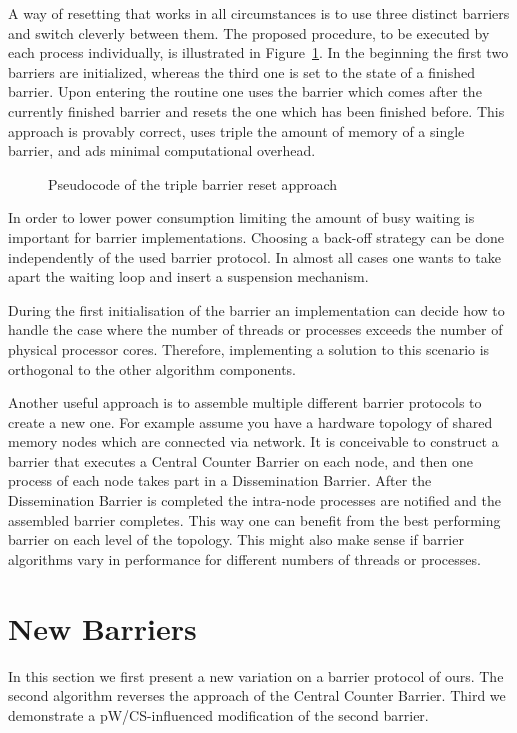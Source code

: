 \documentclass[a4paper, 10pt]{article}
\newcommand*\cleartooddpage{
	\clearpage
	\ifthenelse{\isodd{\thepage}}
		{}
		{\newpage \mbox{} \clearpage}
}
\begin{document}
A way of resetting that works in all circumstances is to use three distinct barriers and switch cleverly between them. The proposed procedure, to be executed by each process individually, is illustrated in Figure~\ref{fig:pseudocode-triple-reset}. In the beginning the first two barriers are initialized, whereas the third one is set to the state of a finished barrier. Upon entering the routine one uses the barrier which comes after the currently finished barrier and resets the one which has been finished before. This approach is provably correct, uses triple the amount of memory of a single barrier, and ads minimal computational overhead.

\begin{figure}[htpb]
	\centering
	
	\caption{Pseudocode of the triple barrier reset approach}
	\label{fig:pseudocode-triple-reset}
\end{figure}

In order to lower power consumption limiting the amount of busy waiting is important for barrier implementations. Choosing a back-off strategy can be done independently of the used barrier protocol. In almost all cases one wants to take apart the waiting loop and insert a suspension mechanism.

During the first initialisation of the barrier an implementation can decide how to handle the case where the number of threads or processes exceeds the number of physical processor cores. Therefore, implementing a solution to this scenario is orthogonal to the other algorithm components.

Another useful approach is to assemble multiple different barrier protocols to create a new one. For example assume you have a hardware topology of shared memory nodes which are connected via network. It is conceivable to construct a barrier that executes a Central Counter Barrier on each node, and then one process of each node takes part in a Dissemination Barrier. After the Dissemination Barrier is completed the intra-node processes are notified and the assembled barrier completes.
This way one can benefit from the best performing barrier on each level of the topology.
This might also make sense if barrier algorithms vary in performance for different numbers of threads or processes.

\cleartooddpage
\section{New Barriers}
\label{sec:new}
In this section we first present a new variation on a barrier protocol of ours. The second algorithm reverses the approach of the Central Counter Barrier. Third we demonstrate a pW/CS-influenced modification of the second barrier.
\end{document}
